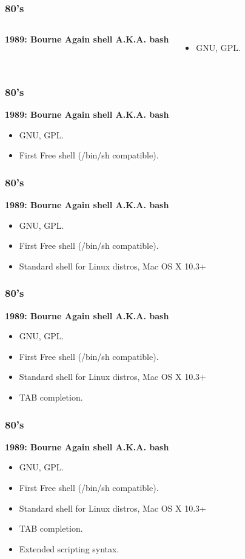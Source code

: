 \documentclass[aspectratio=169]{beamer}
\begin{document}
\begin{frame}
	\frametitle{ 80's}
	\begin{columns}[c]
			\textbf{1989: Bourne Again shell A.K.A. bash}
				\begin{itemize}
					\item GNU, GPL.
				\end{itemize}
			\begin{figure}[h!]
			\end{figure}		
	\end{columns}
\end{frame}

\begin{frame}
	\frametitle{ 80's}
	\textbf{1989: Bourne Again shell A.K.A. bash}
	\begin{itemize}
		\item GNU, GPL.
		\item First Free shell (/bin/sh compatible).
	\end{itemize}
\end{frame}

\begin{frame}
	\frametitle{ 80's}
	\textbf{1989: Bourne Again shell A.K.A. bash}
	\begin{itemize}
		\item GNU, GPL.
		\item First Free shell (/bin/sh compatible).
		\item Standard shell for Linux distros, Mac OS X 10.3+
	\end{itemize}
\end{frame}

\begin{frame}
	\frametitle{ 80's}
	\textbf{1989: Bourne Again shell A.K.A. bash}
	\begin{itemize}
		\item GNU, GPL.
		\item First Free shell (/bin/sh compatible).
		\item Standard shell for Linux distros, Mac OS X 10.3+
		\item TAB completion.
	\end{itemize}
\end{frame}

\begin{frame}
	\frametitle{ 80's}
	\textbf{1989: Bourne Again shell A.K.A. bash}
	\begin{itemize}
		\item GNU, GPL.
		\item First Free shell (/bin/sh compatible).
		\item Standard shell for Linux distros, Mac OS X 10.3+
		\item TAB completion.
		\item Extended scripting syntax.
	\end{itemize}
\end{frame}
\end{document}

